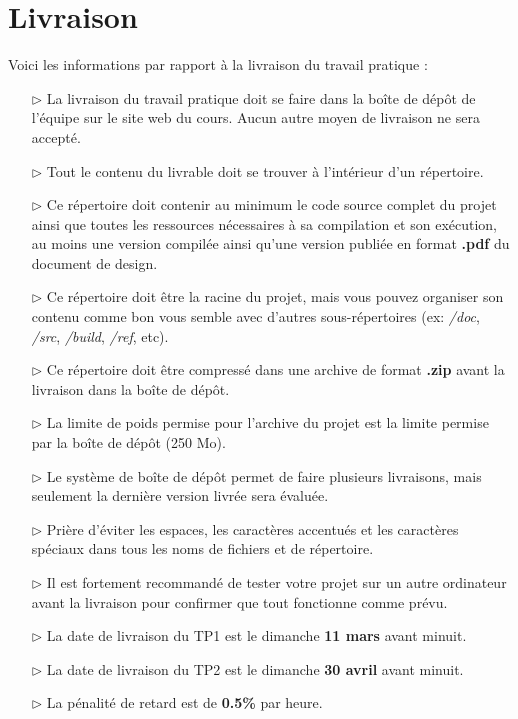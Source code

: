 \documentclass[12pt]{article}
\newcommand{\state}{\noindent}
\begin{document}
\pagebreak

\section*{Livraison}

\state
Voici les informations par rapport à la livraison du travail pratique :

\begin{itemize}
\item[$\triangleright$]
La livraison du travail pratique doit se faire dans la boîte de dépôt de l'équipe sur le site web du cours. Aucun autre moyen de livraison ne sera accepté.
\item[$\triangleright$]
Tout le contenu du livrable doit se trouver à l'intérieur d'un répertoire.
\item[$\triangleright$]
Ce répertoire doit contenir au minimum le code source complet du projet ainsi que toutes les ressources nécessaires à sa compilation et son exécution, au moins une version compilée ainsi qu'une version publiée en format \textbf{.pdf} du document de design.
\item[$\triangleright$] Ce répertoire doit être la racine du projet, mais vous pouvez organiser son contenu comme bon vous semble avec d'autres sous-répertoires (ex: \textit{/doc}, \textit{/src}, \textit{/build}, \textit{/ref}, etc).
\item[$\triangleright$] Ce répertoire doit être compressé dans une archive de format \textbf{.zip} avant la livraison dans la boîte de dépôt.
\item[$\triangleright$]
La limite de poids permise pour l'archive du projet est la limite permise par la boîte de dépôt (250 Mo).
\item[$\triangleright$]
Le système de boîte de dépôt permet de faire plusieurs livraisons, mais seulement la dernière version livrée sera évaluée.
\item[$\triangleright$]
Prière d'éviter les espaces, les caractères accentués et les caractères spéciaux dans tous les noms de fichiers et de répertoire.
\item[$\triangleright$]
Il est fortement recommandé de tester votre projet sur un autre ordinateur avant la livraison pour confirmer que tout fonctionne comme prévu.
\item[$\triangleright$]
La date de livraison du TP1 est le dimanche \textbf{11 mars} avant minuit.
\item[$\triangleright$]
La date de livraison du TP2 est le dimanche \textbf{30 avril} avant minuit.
\item[$\triangleright$]
La pénalité de retard est de \textbf{0.5\%} par heure.
\end{itemize}
\end{document}
